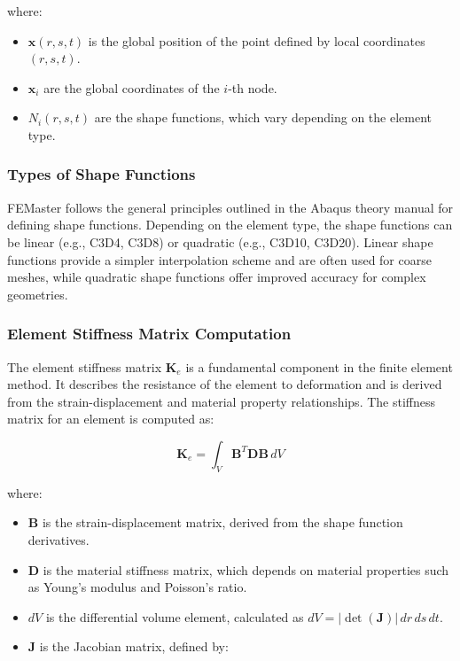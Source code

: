 where:
\begin{itemize}
    \item \( \mathbf{x}(r, s, t) \) is the global position of the point defined by local coordinates \( (r, s, t) \).
    \item \( \mathbf{x}_i \) are the global coordinates of the \(i\)-th node.
    \item \( N_i(r, s, t) \) are the shape functions, which vary depending on the element type.
\end{itemize}

\subsubsection{Types of Shape Functions}

FEMaster follows the general principles outlined in the Abaqus theory manual for defining shape functions. Depending on the element type, the shape functions can be linear (e.g., C3D4, C3D8) or quadratic (e.g., C3D10, C3D20). Linear shape functions provide a simpler interpolation scheme and are often used for coarse meshes, while quadratic shape functions offer improved accuracy for complex geometries.

\subsubsection{Element Stiffness Matrix Computation}

The element stiffness matrix \(\mathbf{K}_e\) is a fundamental component in the finite element method. It describes the resistance of the element to deformation and is derived from the strain-displacement and material property relationships. The stiffness matrix for an element is computed as:

\[
\mathbf{K}_e = \int_{V} \mathbf{B}^T \mathbf{D} \mathbf{B} \, dV
\]

where:
\begin{itemize}
    \item \( \mathbf{B} \) is the strain-displacement matrix, derived from the shape function derivatives.
    \item \( \mathbf{D} \) is the material stiffness matrix, which depends on material properties such as Young's modulus and Poisson's ratio.
    \item \( dV \) is the differential volume element, calculated as \( dV = \left| \det(\mathbf{J}) \right| \, dr \, ds \, dt \).
    \item \( \mathbf{J} \) is the Jacobian matrix, defined by:
\end{itemize}

